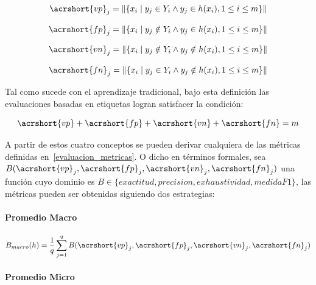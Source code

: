 \begin{equation}
	\acrshort{vp}_{j} = \left\|\{x_{i}\mid y_{j} \in Y_{i} \land y_{j} \in
	h(x_{i}), 1 \leq i \leq m\}\right\|
\end{equation}

\begin{equation}
	\acrshort{fp}_{j} = \left\|\{x_{i}\mid y_{j} \notin Y_{i} \land y_{j} \in
	h(x_{i}), 1 \leq i \leq m\}\right\|
\end{equation}

\begin{equation}
	\acrshort{vn}_{j} = \left\|\{x_{i}\mid y_{j} \notin Y_{i} \land y_{j} \notin
	h(x_{i}), 1 \leq i \leq m\}\right\|
\end{equation}

\begin{equation}
	\acrshort{fn}_{j} = \left\|\{x_{i}\mid y_{j} \in Y_{i} \land y_{j} \notin
	h(x_{i}), 1 \leq i \leq m\}\right\|
\end{equation}

Tal como sucede con el aprendizaje tradicional, bajo esta definición las
evaluaciones basadas en etiquetas logran satisfacer la condición:

\begin{equation}
	\acrshort{vp} + \acrshort{fp} + \acrshort{vn} + \acrshort{fn} = m
\end{equation}

A partir de estos cuatro conceptos se pueden derivar cualquiera de las métricas
definidas en~\ref{evaluacion_metricas}. O dicho en términos formales, sea
$B(\acrshort{vp}_{j}, \acrshort{fp}_{j}, \acrshort{vn}_{j}, \acrshort{fn}_{j})$
una función cuyo dominio es $B \in \{ exactitud, precision, exhaustividad,
	medidaF1 \}$, las métricas pueden ser obtenidas siguiendo dos estrategias:

\paragraph{Promedio Macro}

\begin{equation}
	B_{macro}(h) = \frac{1}{q} \sum_{j=1}^{q}
	B(\acrshort{vp}_{j}, \acrshort{fp}_{j}, \acrshort{vn}_{j}, \acrshort{fn}_{j})
\end{equation}

\paragraph{Promedio Micro}

